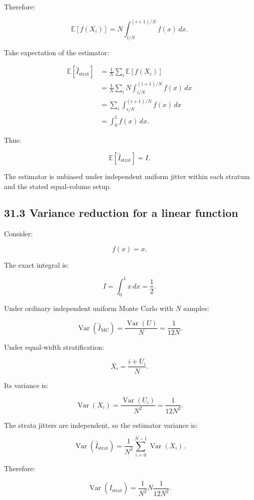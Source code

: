 Therefore:

\[ \mathbb E[f(X_i)] = N\int_{i/N}^{(i+1)/N}f(x)\,dx. \]

Take expectation of the estimator:

\[ \begin{aligned} \mathbb E[\widehat I_{\mathrm{strat}}] &= \frac1N\sum_i\mathbb E[f(X_i)]\\ &= \frac1N\sum_i N\int_{i/N}^{(i+1)/N}f(x)\,dx\\ &= \sum_i\int_{i/N}^{(i+1)/N}f(x)\,dx\\ &= \int_0^1f(x)\,dx. \end{aligned} \]

Thus:

\[ \boxed{ \mathbb E[\widehat I_{\mathrm{strat}}]=I }. \]

The estimator is unbiased under independent uniform jitter within each stratum and the stated equal-volume setup.

\subsection{31.3 Variance reduction for a linear function}\label{02-foundations-ii-ch031-variance-reduction-for-a-linear-function}

\hypertarget{02-foundations-ii-ch031-variance-reduction-for-a-linear-function}{}

Consider:

\[ f(x)=x. \]

The exact integral is:

\[ I=\int_0^1x\,dx=\frac12. \]

Under ordinary independent uniform Monte Carlo with \(N\) samples:

\[ \operatorname{Var}(\widehat I_{\mathrm{MC}}) = \frac{\operatorname{Var}(U)}N = \boxed{\frac1{12N}}. \]

Under equal-width stratification:

\[ X_i=\frac{i+U_i}{N}. \]

Its variance is:

\[ \operatorname{Var}(X_i) = \frac{\operatorname{Var}(U_i)}{N^2} = \frac1{12N^2}. \]

The strata jitters are independent, so the estimator variance is:

\[ \operatorname{Var}(\widehat I_{\mathrm{strat}}) = \frac1{N^2} \sum_{i=0}^{N-1}\operatorname{Var}(X_i). \]

Therefore:

\[ \operatorname{Var}(\widehat I_{\mathrm{strat}}) = \frac1{N^2} N\frac1{12N^2}. \]

